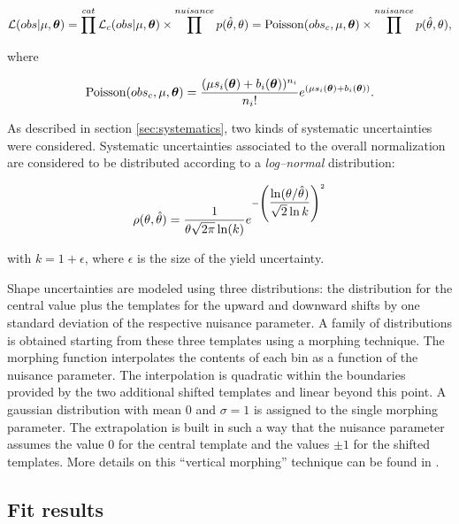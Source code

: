 \begin{equation}
\mathcal{L}(obs|\mu, \boldsymbol\theta) = \prod^{cat} \mathcal{L}_c(obs|\mu, \boldsymbol\theta) \times \prod^{nuisance} p(\hat{\theta},\theta) = \operatorname{Poisson}(obs_c, \mu, \boldsymbol\theta) \times \prod^{nuisance} p(\hat{\theta},\theta),
\end{equation}

where

\begin{equation}
\operatorname{Poisson}(obs_c, \mu, \boldsymbol\theta) = \dfrac{(\mu s_i(\boldsymbol\theta) + b_i(\boldsymbol\theta))^{n_i}}{n_i!}e^{(\mu s_i(\boldsymbol\theta) + b_i(\boldsymbol\theta))}.
\end{equation}

As described in section \ref{sec:systematics}, two kinds of systematic uncertainties were considered. Systematic uncertainties associated to the overall normalization are considered to be distributed according to a \emph{log--normal} distribution:

\begin{equation}
\rho(\theta, \hat{\theta}) = \dfrac{1}{\theta\sqrt{2\pi}\operatorname{ln}(k)} e^{-\left(\dfrac{\operatorname{ln}(\theta/\hat{\theta})}{\sqrt{2}\operatorname{ln}k}\right)^2}
\end{equation}

with $k = 1+ \epsilon$, where $\epsilon$ is the size of the yield uncertainty.

Shape uncertainties are modeled using three distributions: the distribution for the central value plus the templates for the upward and downward shifts by one standard deviation of the respective nuisance parameter. A family of distributions is obtained starting from these three templates using a morphing technique. The morphing function interpolates the contents of each bin as a function of the nuisance parameter. The interpolation is quadratic within the boundaries provided by the two additional shifted templates and linear beyond this point. A gaussian distribution with mean 0 and $\sigma = 1$ is assigned to the single morphing parameter. The extrapolation is built in such a way that the nuisance parameter assumes the value 0 for the central template and the values $\pm1$ for the shifted templates. More details on this ``vertical morphing'' technique can be found in \cite{Conway:2011in}.

\subsection{Fit results}

